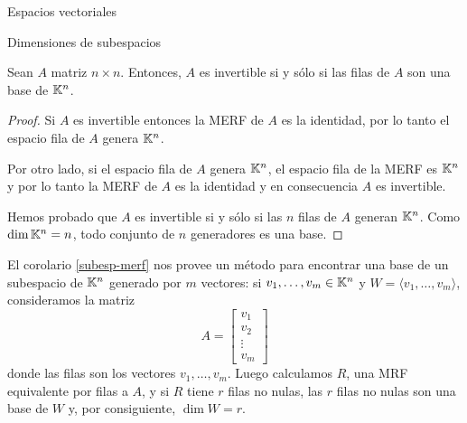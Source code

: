 \begin{chapter}{Espacios vectoriales}
\begin{section}{Dimensiones de subespacios}
    \begin{corolario}\label{inv-impl-filasgen}
            Sean $A$ matriz $n \times n$. Entonces, $A$ es invertible si y sólo si las filas de $A$ son una base de $\mathbb K^n$.
    \end{corolario}
    \begin{proof}
        Si $A$ es invertible entonces la MERF de $A$ es la identidad, por lo tanto  el espacio fila de $A$ genera $\mathbb K^n$.
        
        Por otro lado, si el espacio fila de $A$  genera $\mathbb K^n$, el espacio fila de  la  MERF es $\mathbb K^n$ y por lo tanto  la MERF de $A$ es la identidad y en consecuencia $A$ es invertible.
        
        Hemos probado que $A$ es invertible si y sólo si las $n$ filas de $A$ generan $\mathbb K^n$. Como $\dim \mathbb K^n = n$,  todo conjunto de $n$ generadores es una base. 
    \end{proof}
    
    
    El  corolario  \ref{subesp-merf} nos provee un método para encontrar una base de un  subespacio de $\mathbb K^n$ generado por $m$ vectores: si $v_1,\ldots,v_m \in \mathbb K^n$ y $W = \langle v_1,\ldots,v_m\rangle$, consideramos la matriz 
    $$
    A = \begin{bmatrix}
    v_1 \\ v_2 \\ \vdots \\ v_m
    \end{bmatrix}
    $$
    donde las filas son los vectores $v_1,\ldots,v_m$. Luego calculamos $R$, una MRF equivalente por filas a $A$, y si $R$ tiene $r$ filas no nulas, las $r$ filas no nulas son una base de $W$ y, por consiguiente, $\dim W = r$. 
    

\end{section}
\end{chapter}
